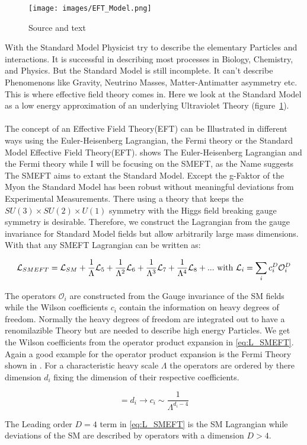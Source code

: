 \documentclass[../Bachelorarbeit.tex]{subfiles}
\begin{document}
\label{sec:EFT}

\begin{figure}[h]
    \centering
    \texttt{[image: images/EFT\_Model.png]}
    \label{fig:EFT_sketch}
    \caption{Source and text \cite{Brivio.2017}}
\end{figure}

With the Standard Model Physicist try to describe the elementary Particles and interactions. It is successful in describing most processes in Biology, Chemistry, and Physics.
But the Standard Model is still incomplete. It can't describe Phenomenons like Gravity, Neutrino Masses, Matter-Antimatter asymmetry etc. This is where effective field theory comes in.
Here we look at the Standard Model as a low energy approximation of an underlying Ultraviolet Theory (figure~\ref{fig:EFT_sketch}).
\\\\
The concept of an Effective Field Theory(EFT) can be Illustrated in different ways using the Euler-Heisenberg Lagrangian, the Fermi theory or the Standard Model Effective Field Theory(EFT).
\cite{Pich.1998} shows The Euler-Heisenberg Lagrangian and the Fermi theory while I will be focusing on the SMEFT, as the Name suggests The SMEFT aims to extant the Standard Model.
Except the g-Faktor of the Myon the Standard Model has been robust without meaningful deviations from Experimental Measurements. 
There using a theory that keeps the $SU(3) \times SU(2) \times U(1)$ symmetry with the Higgs field breaking gauge symmetry is desirable.
Therefore, we construct the Lagrangian from the gauge invariance for Standard Model fields but allow arbitrarily large mass dimensions. 
With that any SMEFT Lagrangian can be written as:

\begin{equation}
    \mathcal{L}_{SMEFT} = \mathcal{L}_{SM} + \frac{1}{\Lambda} \mathcal{L}_{5} + \frac{1}{\Lambda^2} \mathcal{L}_{6} + \frac{1}{\Lambda^3} \mathcal{L}_{7} + \frac{1}{\Lambda^4} \mathcal{L}_{8} + ... \textnormal{ with } \mathcal{L}_{i} = \sum_{i} c_{i}^{D} \mathcal{O}_{i}^{D}
    \label{eq:L_SMEFT}
\end{equation}

The operators $\mathcal{O}_{i}$ are constructed from the Gauge invariance of the SM fields while the Wilson coefficients $c_{i}$ contain the information on heavy degrees of freedom.
Normally the heavy degrees of freedom are integrated out to have a renomilazible Theory but are needed to describe high energy Particles.
We get the Wilson coefficients from the operator product expansion in \ref{eq:L_SMEFT}. Again a good example for the operator product expansion is the Fermi Theory shown in \cite{Pich.1998}.
For a characteristic heavy scale $\Lambda$ the operators are ordered by there dimension $d_{i}$ fixing the dimension of their respective coefficients.

\begin{equation}
    [\mathcal{O}_i] = d_{i} \longrightarrow c_{i} \sim \frac{1}{\Lambda^{d_{i}-4}}
\end{equation}

The Leading order $D = 4$ term in \ref{eq:L_SMEFT} is the SM Lagrangian while deviations of the SM are described by operators with a dimension $D>4$.
\end{document}
